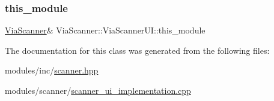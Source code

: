 \subsubsection{\texorpdfstring{this\+\_\+module}{this\_module}}
{\footnotesize\ttfamily \mbox{\hyperlink{class_via_scanner}{Via\+Scanner}}\& Via\+Scanner\+::\+Via\+Scanner\+U\+I\+::this\+\_\+module}



The documentation for this class was generated from the following files\+:\begin{DoxyCompactItemize}
\item 
modules/inc/\mbox{\hyperlink{scanner_8hpp}{scanner.\+hpp}}\item 
modules/scanner/\mbox{\hyperlink{scanner__ui__implementation_8cpp}{scanner\+\_\+ui\+\_\+implementation.\+cpp}}\end{DoxyCompactItemize}
